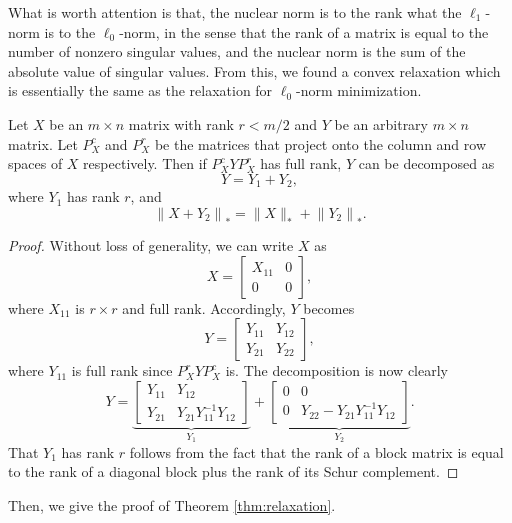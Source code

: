 \documentclass[11pt]{article}
\begin{document}
What is worth attention is that, the nuclear norm is to the rank what the \(\ell_1\)-norm is to the \(\ell_0\)-norm, in the sense that the rank of a matrix is equal to the number of nonzero singular values, and the nuclear norm is the sum of the absolute value of singular values. From this, we found a convex relaxation which is essentially the same as the relaxation for \(\ell_0\)-norm minimization. 
\begin{lemma}
    Let $X$ be an $m\times n$ matrix with rank $r<m/2$ and $Y$ be an arbitrary $m \times n$ matrix. Let $P_{X}^{c}$ and $P_{X}^{r}$ be the matrices that project onto the column and row spaces of $X$ respectively. Then if $P_{X}^{c} Y P_{X}^{r}$ has full rank, $Y$ can be decomposed as
    $$
    Y=Y_{1}+Y_{2},
    $$
    where $Y_{1}$ has rank $r$, and
    $$
    \left\|X+Y_{2}\right\|_*=\|X\|_*+\left\|Y_{2}\right\|_* .
    $$
\end{lemma}
\begin{proof}
Without loss of generality, we can write $X$ as
$$
X=\begin{bmatrix}
X_{11} & 0 \\
0 & 0
\end{bmatrix},
$$
where $X_{11}$ is $r \times r$ and full rank. Accordingly, $Y$ becomes
$$
Y=\begin{bmatrix}
Y_{11} & Y_{12} \\
Y_{21} & Y_{22}
\end{bmatrix},
$$
where $Y_{11}$ is full rank since $P_{X}^{r} Y P_{X}^{c}$ is. The decomposition is now clearly
$$
Y=\underbrace{\begin{bmatrix}
Y_{11} & Y_{12} \\
Y_{21} & Y_{21} Y_{11}^{-1} Y_{12}
\end{bmatrix}}_{Y_{1}}+\underbrace{\begin{bmatrix}
0 & 0 \\
0 & Y_{22}-Y_{21} Y_{11}^{-1} Y_{12}
\end{bmatrix}}_{Y_{2}} .
$$
That $Y_{1}$ has rank $r$ follows from the fact that the rank of a block matrix is equal to the rank of a diagonal block plus the rank of its Schur complement.
\end{proof}
Then, we give the proof of Theorem \ref{thm:relaxation}.
\end{document}
